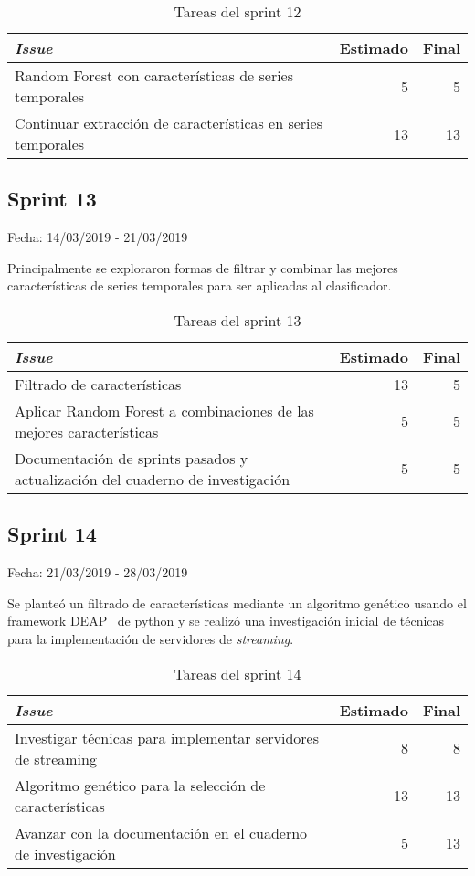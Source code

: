 \begin{table}[H]
	\begin{tabularx}{\textwidth}{Xrr}
		\toprule \textbf{\textit{Issue}} & \textbf{Estimado} & \textbf{Final}\\
		\toprule
		Random Forest con características de series temporales & 5 & 5 \\
		Continuar extracción de características en series temporales & 13 & 13 \\
		\bottomrule
	\end{tabularx}
	\caption{Tareas del sprint 12}
\end{table}

\subsection{Sprint 13}

Fecha: 14/03/2019 - 21/03/2019

Principalmente se exploraron formas de filtrar y combinar las mejores características de series temporales para ser aplicadas al clasificador. 

\begin{table}[H]
	\begin{tabularx}{\textwidth}{Xrr}
		\toprule \textbf{\textit{Issue}} & \textbf{Estimado} & \textbf{Final}\\
		\toprule 
		Filtrado de características & 13 & 5 \\
		Aplicar Random Forest a combinaciones de las mejores características & 5 & 5 \\
		Documentación de sprints pasados y actualización del cuaderno de investigación & 5 & 5 \\
		\bottomrule
	\end{tabularx}
	\caption{Tareas del sprint 13}
\end{table}

\subsection{Sprint 14}

Fecha: 21/03/2019 - 28/03/2019

Se planteó un filtrado de características mediante un algoritmo genético usando el framework DEAP~\cite{deap} de python y se realizó una investigación inicial de técnicas para la implementación de servidores de \textit{streaming}. 

\begin{table}[H]
	\begin{tabularx}{\textwidth}{Xrr}
		\toprule \textbf{\textit{Issue}} & \textbf{Estimado} & \textbf{Final}\\
		\toprule 
		Investigar técnicas para implementar servidores de streaming & 8 & 8 \\
		Algoritmo genético para la selección de características & 13 & 13 \\
		Avanzar con la documentación en el cuaderno de investigación & 5 & 13 \\
		\bottomrule
	\end{tabularx}
	\caption{Tareas del sprint 14}
\end{table}

